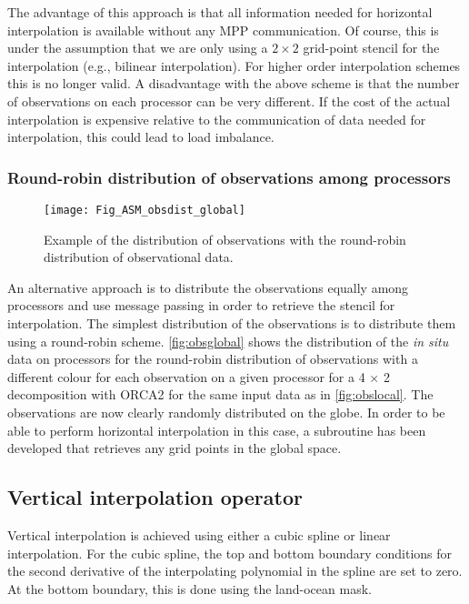 \documentclass[../tex_main/NEMO_manual]{subfiles}
\begin{document}
The advantage of this approach is that all information needed for horizontal interpolation is available without
any MPP communication.
Of course, this is under the assumption that we are only using a $2 \times 2$ grid-point stencil for
the interpolation (e.g., bilinear interpolation).
For higher order interpolation schemes this is no longer valid.
A disadvantage with the above scheme is that the number of observations on each processor can be very different.
If the cost of the actual interpolation is expensive relative to the communication of data needed for interpolation,
this could lead to load imbalance.

\subsubsection{Round-robin distribution of observations among processors}

\begin{figure}     \begin{center}
\texttt{[image: Fig\_ASM\_obsdist\_global]}
\caption{      \protect\label{fig:obsglobal}
  Example of the distribution of observations with the round-robin distribution of observational data.}
\end{center}     \end{figure}

An alternative approach is to distribute the observations equally among processors and
use message passing in order to retrieve the stencil for interpolation.
The simplest distribution of the observations is to distribute them using a round-robin scheme.
\autoref{fig:obsglobal} shows the distribution of the {\em in situ} data on processors for
the round-robin distribution of observations with a different colour for each observation on a given processor for
a 4 $\times$ 2 decomposition with ORCA2 for the same input data as in \autoref{fig:obslocal}.
The observations are now clearly randomly distributed on the globe.
In order to be able to perform horizontal interpolation in this case,
a subroutine has been developed that retrieves any grid points in the global space.

\subsection{Vertical interpolation operator}

Vertical interpolation is achieved using either a cubic spline or linear interpolation.
For the cubic spline, the top and bottom boundary conditions for the second derivative of
the interpolating polynomial in the spline are set to zero.
At the bottom boundary, this is done using the land-ocean mask.
\end{document}

